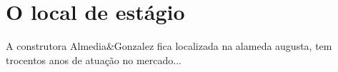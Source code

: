 \chapter{O local de estágio}

A construtora Almedia\&{}Gonzalez fica localizada na alameda augusta, tem trocentos anos de atuação no mercado...